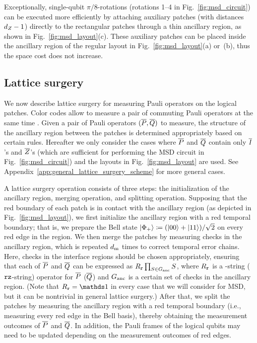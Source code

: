 \documentclass[
 prx,
 reprint,
 superscriptaddress,
 longbibliography,
 dvipsnames
]{revtex4-2}
\begin{document}
Exceptionally, single-qubit $\pi/8$-rotations (rotations 1--4 in Fig.~\ref{fig:msd_circuit}) can be executed more efficiently by attaching auxiliary patches (with distances ${d_Z}-1$) directly to the rectangular patches through a thin ancillary region, as shown in Fig.~\ref{fig:msd_layout}(c).
These auxiliary patches can be placed inside the ancillary region of the regular layout in Fig.~\ref{fig:msd_layout}(a) or~(b), thus the space cost does not increase.

\subsection{Lattice surgery \label{subsec:lattice_surgery}}

We now describe lattice surgery for measuring Pauli operators on the logical patches.
Color codes allow to measure a pair of commuting Pauli operators at the same time \cite{thomsen2024low}.
Given a pair of Pauli operators $(\overline{P}, \overline{Q})$ to measure, the structure of the ancillary region between the patches is determined appropriately based on certain rules.
Hereafter we only consider the cases where $\overline{P}$ and $\overline{Q}$ contain only $\overline{I}$'s and $\overline{Z}$'s (which are sufficient for performing the MSD circuit in Fig.~\ref{fig:msd_circuit}) and the layouts in Fig.~\ref{fig:msd_layout} are used.
See Appendix~\ref{app:general_lattice_surgery_scheme} for more general cases.

A lattice surgery operation consists of three steps: the initialization of the ancillary region, merging operation, and splitting operation.
Supposing that the red boundary of each patch is in contact with the ancillary region (as depicted in Fig.~\ref{fig:msd_layout}), we first initialize the ancillary region with a red temporal boundary; that is, we prepare the Bell state $\ket{\Phi_+} \coloneqq (\ket{00} + \ket{11})/\sqrt{2}$ on every red edge in the region.
We then merge the patches by measuring checks in the ancillary region, which is repeated $d_{\mathrm{m}}$ times to correct temporal error chains.
Here, checks in the interface regions should be chosen appropriately, ensuring that each of $\overline{P}$ and $\overline{Q}$ can be expressed as $R_{\texttt{r}} \prod_{S \in G_{\mathrm{anc}}} S$, where $R_{\texttt{r}}$ is a \rx-string ($\texttt{rz}$-string) operator for $\overline{P}$ ($\overline{Q}$) and $G_{\mathrm{anc}}$ is a certain set of checks in the ancillary region.
(Note that $R_\rbs = \identity$ in every case that we will consider for MSD, but it can be nontrivial in general lattice surgery.)
After that, we split the patches by measuring the ancillary region with a red temporal boundary (i.e., measuring every red edge in the Bell basis), thereby obtaining the measurement outcomes of $\overline{P}$ and $\overline{Q}$.
In addition, the Pauli frames of the logical qubits may need to be updated depending on the measurement outcomes of red edges.
\end{document}
